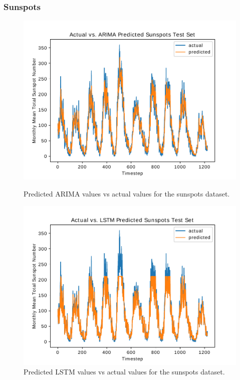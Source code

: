 \documentclass{article}
\begin{document}
\subsubsection{Sunspots} \label{sec:sunspots_results}
\begin{figure}
\centering
{}
	\centering
  \includegraphics[scale=0.28]{imgs/arima_results_sunspots.pdf}
  \caption{Predicted ARIMA values vs actual values for the sunspots dataset.}\label{fig:sunspots_graph_arima}
\endminipage\hfill
{}
	\centering
  \includegraphics[scale=0.28]{imgs/lstm_results_sunspots.pdf}
  \caption{Predicted LSTM values vs actual values for the sunspots dataset.}\label{fig:sunspots_graph_lstm}
\endminipage\hfill
{}

\end{figure}
\end{document}
